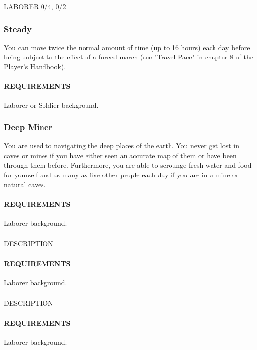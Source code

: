 LABORER 0/4, 0/2
    \subsubsection{Steady} \label{feat::steady}
    You can move twice the normal amount of time (up to 16 hours) each day before being subject to the effect of a forced march (see "Travel Pace" in chapter 8 of the Player's Handbook).
    \paragraph{REQUIREMENTS} Laborer or Soldier background.

    \subsubsection{Deep Miner} \label{feat::deepminer}
    You are used to navigating the deep places of the earth.
    You never get lost in caves or mines if you have either seen an accurate map of them or have been through them before.
    Furthermore, you are able to scrounge fresh water and food for yourself and as many as five other people each day if you are in a mine or natural caves.
    \paragraph{REQUIREMENTS} Laborer background.

    \subsubsection{} \label{feat::NAME}
    DESCRIPTION
    \paragraph{REQUIREMENTS} Laborer background.

    \subsubsection{} \label{feat::NAME}
    DESCRIPTION
    \paragraph{REQUIREMENTS} Laborer background.

